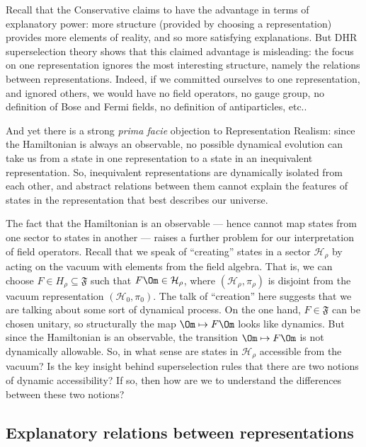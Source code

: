 \documentclass[12pt]{article}
\theoremstyle{definition}
\theoremstyle{definition}
\theoremstyle{remark}
\def\2#1{{\mathcal #1}}
\def\al#1{{\mathfrak #1}}
\begin{document}
Recall that the Conservative claims to have the
advantage in terms of explanatory power: more structure
(provided by choosing a representation) provides more
elements of reality, and so more satisfying
explanations.  But DHR superselection theory shows that
this claimed advantage is misleading: the focus on one
representation ignores the most interesting structure,
namely the relations between representations.  Indeed,
if we committed ourselves to one representation, and
ignored others, we would have no field operators, no
gauge group, no definition of Bose and Fermi fields, no
definition of antiparticles, etc..

And yet there is a strong \emph{prima facie} objection to
Representation Realism: since the Hamiltonian is always an observable,
no possible dynamical evolution can take us from a state in one
representation to a state in an inequivalent representation.  So,
inequivalent representations are dynamically isolated from each other,
and abstract relations between them cannot explain the features of
states in the representation that best describes our universe.

The fact that the Hamiltonian is an observable --- hence cannot map
states from one sector to states in another --- raises a further
problem for our interpretation of field operators.  Recall that we
speak of ``creating'' states in a sector $\2H _\rho$ by acting on the
vacuum with elements from the field algebra.  That is, we can choose
$F\in H_\rho \subseteq \al F$ such that $F\Om \in \2H _\rho$, where
$(\2H _\rho ,\pi _\rho )$ is disjoint from the vacuum representation
$(\2H _0,\pi _0)$.  The talk of ``creation'' here suggests that we are
talking about some sort of dynamical process.  On the one hand, $F\in
\al F$ can be chosen unitary, so structurally the map $\Om \mapsto
F\Om$ looks like dynamics.  But since the Hamiltonian is an
observable, the transition $\Om \mapsto F\Om$ is not dynamically
allowable.  So, in what sense are states in $\2H _\rho$ accessible
from the vacuum?  Is the key insight behind superselection rules that
there are two notions of dynamic accessibility?  If so, then how are
we to understand the differences between these two notions?


\subsection{Explanatory relations between representations}
\end{document}
